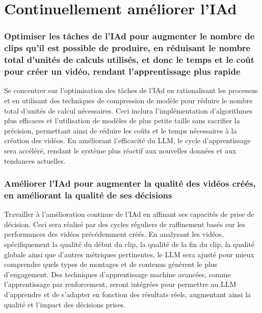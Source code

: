 \documentclass[livre]{udes-genie-these}
\begin{document}
{{\section{Continuellement améliorer l'IAd}
\subsubsection{Optimiser les tâches de l'IAd pour augmenter le nombre de clips qu'il est possible de produire, en réduisant le nombre total d'unités de calculs utilisés, et donc le temps et le coût pour créer un vidéo, rendant l'apprentissage plus rapide}
Se concentrer sur l'optimisation des tâches de l'IAd en rationalisant les processus et en utilisant des techniques de compression de modèle pour réduire le nombre total d'unités de calcul nécessaires. Ceci inclura l'implémentation d'algorithmes plus efficaces et l'utilisation de modèles de plus petite taille sans sacrifier la précision, permettant ainsi de réduire les coûts et le temps nécessaires à la création des vidéos. En améliorant l'efficacité du LLM, le cycle d'apprentissage sera accéléré, rendant le système plus réactif aux nouvelles données et aux tendances actuelles. 

\subsubsection{Améliorer l'IAd pour augmenter la qualité des vidéos créés, en améliorant la qualité de ses décisions}
Travailler à l'amélioration continue de l'IAd en affinant ses capacités de prise de décision. Ceci sera réalisé par des cycles réguliers de raffinement basés sur les performances des vidéos précédemment créés. En analysant les vidéos, spécifiquement la qualité du début du clip, la qualité de la fin du clip, la qualité globale ainsi que d'autres métriques pertinentes, le LLM sera ajusté pour mieux comprendre quels types de montages et de contenus génèrent le plus d'engagement. Des techniques d'apprentissage machine avancées, comme l'apprentissage par renforcement, seront intégrées pour permettre au LLM d'apprendre et de s'adapter en fonction des résultats réels, augmentant ainsi la qualité et l'impact des décisions prises.

}}
\end{document}
